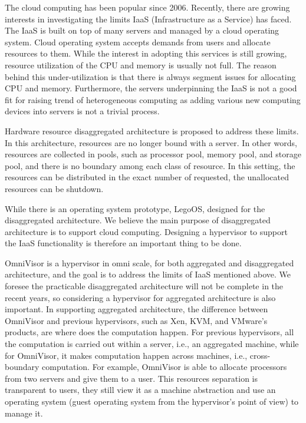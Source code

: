 \documentclass[twocolumn]{article}
\begin{document}
The cloud computing has been popular since 2006. Recently, there are growing interests in investigating the limits IaaS (Infrastructure as a Service) has faced. The IaaS is built on top of many servers and managed by a cloud operating system.  Cloud operating system accepts demands from users and allocate resources to them. While the interest in adopting this services is still growing, resource utilization of the CPU and memory is usually not full. The reason behind this under-utilization is that there is always segment issues for allocating CPU and memory. Furthermore, the servers underpinning the IaaS is not a good fit for raising trend of heterogeneous computing as adding various new computing devices into servers is not a trivial process. \par
    Hardware resource disaggregated architecture is proposed to address these limits. In this architecture, resources are no longer bound with a server. In other words, resources are collected in pools, such as processor pool, memory pool, and storage pool, and there is no boundary among each class of resource. In this setting, the resources can be distributed in the exact number of requested, the unallocated resources can be shutdown. \par
    While there is an operating system prototype, LegoOS, designed for the disaggregated architecture. We believe the main purpose of disaggregated architecture is to support cloud computing. Designing a hypervisor to support the IaaS functionality is therefore an important thing to be done. \par
    OmniVisor is a hypervisor in omni scale, for both aggregated and disaggregated architecture, and the goal is to address the limits of IaaS mentioned above. We foresee the practicable disaggregated architecture will not be complete in the recent years, so considering a hypervisor for aggregated architecture is also important. In supporting aggregated architecture, the difference between OmniVisor and previous hypervisors, such as Xen, KVM, and VMware’s products, are where does the computation happen. For previous hypervisors, all the computation is carried out within a server, i.e., an aggregated machine, while for OmniVisor, it makes computation happen across machines, i.e., cross-boundary computation. For example, OmniVisor is able to allocate processors from two servers and give them to a user. This resources separation is transparent to users, they still view it as a machine abstraction and use an operating system (guest operating system from the hypervisor’s point of view) to manage it. \par
\end{document}

